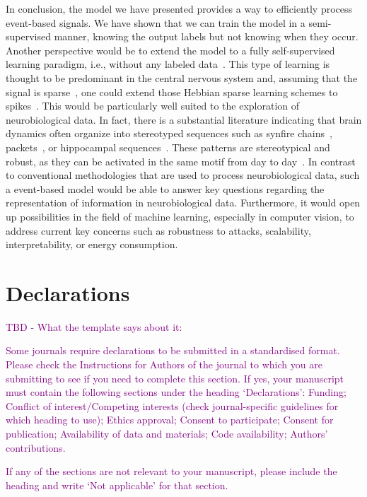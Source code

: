 \documentclass[default]{sn-jnl}%
\theoremstyle{thmstyleone}%
\theoremstyle{thmstyletwo}%
\theoremstyle{thmstylethree}%
\begin{document}
In conclusion, the model we have presented provides a way to efficiently process event-based signals. We have shown that we can train the model in a semi-supervised manner, knowing the output labels but not knowing when they occur. Another perspective would be to extend the model to a fully self-supervised learning paradigm, i.e., without any labeled data~\citep{barlow_unsupervised_1989}. This type of learning is thought to be predominant in the central nervous system and, assuming that the signal is sparse~\citep{olshausen_emergence_1996}, one could extend those Hebbian sparse learning schemes to spikes~\citep{perrinet_emergence_2004, masquelier_competitive_2009}. This would be particularly well suited to the exploration of neurobiological data. In fact, there is a substantial literature indicating that brain dynamics often organize into stereotyped sequences such as synfire chains~\citep{ikegaya_synfire_2004}, packets~\citep{luczak_sequential_2007}, or hippocampal sequences~\citep{pastalkova_internally_2008, villette_internally_2015}. These patterns are stereotypical and robust, as they can be activated in the same motif from day to day~\citep{haimerl_internal_2019}. In contrast to conventional methodologies that are used to process neurobiological data, such a event-based model would be able to answer key questions regarding the representation of information in neurobiological data. Furthermore, it would open up possibilities in the field of machine learning, especially in computer vision, to address current key concerns such as robustness to attacks, scalability, interpretability, or energy consumption.



\backmatter


\Acknowledgments

\section*{Declarations}

\textcolor{purple}{TBD - What the template says about it:}

\textcolor{purple}{Some journals require declarations to be submitted in a standardised format. Please check the Instructions for Authors of the journal to which you are submitting to see if you need to complete this section. If yes, your manuscript must contain the following sections under the heading `Declarations': Funding; Conflict of interest/Competing interests (check journal-specific guidelines for which heading to use); Ethics approval; Consent to participate; Consent for publication; Availability of data and materials; Code availability; Authors' contributions. }

\textcolor{purple}{If any of the sections are not relevant to your manuscript, please include the heading and write `Not applicable' for that section. }




\end{document}
